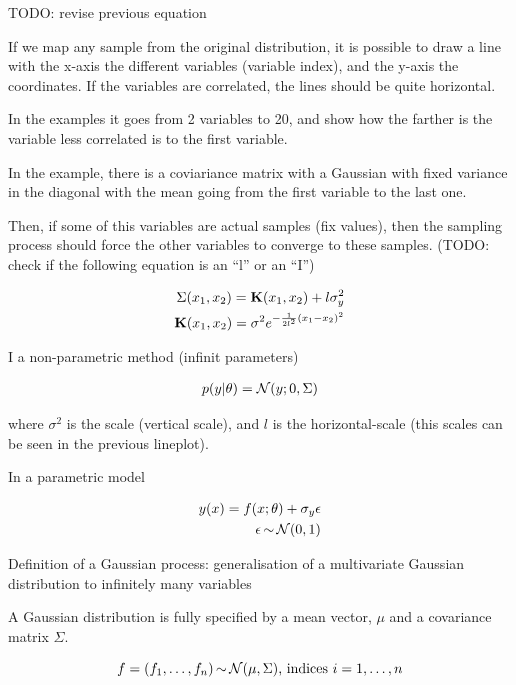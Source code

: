 \documentclass[b5paper]{report}
\begin{document}
TODO: revise previous equation

If we map any sample from the original distribution, it is possible to draw a
line with the x-axis the different variables (variable index), and the y-axis the coordinates.
If the variables are correlated, the lines should be quite horizontal.

In the examples it goes from 2 variables to 20, and show how the farther is the
variable less correlated is to the first variable.

In the example, there is a coviariance matrix with a Gaussian with fixed
variance in the diagonal with the mean going from the first variable to the
last one.

Then, if some of this variables are actual samples (fix values), then the
sampling process should force the other variables to converge to these samples.
(TODO: check if the following equation is an ``l'' or an ``I'')

\begin{align}
  \Sigma(x_1, x_2) = \operatorname*{\mathbf{K}}(x_1, x_2) + l\sigma_y^2 \\
  \operatorname*{\mathbf{K}}(x_1, x_2) = \sigma^2e^{-\frac{1}{2l^2}(x_1 - x_2)^2}
\end{align}

I a non-parametric method  (infinit parameters)

\begin{align}
  p(y|\theta) = \operatorname*{\mathcal{N}}(y;0,\Sigma) \\
\end{align}

where $\sigma^2$ is the scale (vertical scale), and $l$ is the horizontal-scale
(this scales can be seen in the previous lineplot).

In a parametric model

\begin{align}
  y(x) = f(x;\theta) + \sigma_y \epsilon \\
  \epsilon \operatorname*{\sim} \operatorname*{\mathcal{N}}(0,1)
\end{align}

Definition of a Gaussian process: generalisation of a multivariate Gaussian
distribution to infinitely many variables

A Gaussian distribution is fully specified by a mean vector, $\mu$ and a
covariance matrix $\Sigma$.

\begin{equation}
  f = (f_1, \dots, f_n) \operatorname*{\sim} \operatorname*{\mathcal{N}}(\mu, \Sigma) \text{, indices } i=1,
  \dots, n
\end{equation}
\end{document}
